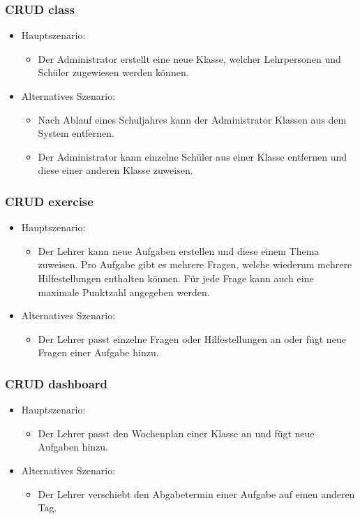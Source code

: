 \newpage

\subsubsection*{CRUD class}

\begin{itemize}
	\item Hauptszenario:
	\begin{itemize}
		\item Der Administrator erstellt eine neue Klasse, welcher Lehrpersonen und Schüler zugewiesen werden können.
	\end{itemize}
	\item Alternatives Szenario:
	\begin{itemize}
		\item Nach Ablauf eines Schuljahres kann der Administrator Klassen aus dem System entfernen.
		\item Der Administrator kann einzelne Schüler aus einer Klasse entfernen und diese einer anderen Klasse zuweisen.
	\end{itemize}
\end{itemize}


\subsubsection*{CRUD exercise}
\begin{itemize}
	\item Hauptszenario:
	\begin{itemize}
		\item Der Lehrer kann neue Aufgaben erstellen und diese einem Thema zuweisen. Pro Aufgabe gibt es mehrere Fragen, welche wiederum mehrere Hilfestellungen enthalten können. Für jede Frage kann auch eine maximale Punktzahl angegeben werden. 
	\end{itemize}
	\item Alternatives Szenario:
	\begin{itemize}
		\item Der Lehrer passt einzelne Fragen oder Hilfestellungen an oder fügt neue Fragen einer Aufgabe hinzu.
	\end{itemize}
\end{itemize}



\subsubsection*{CRUD dashboard}
\begin{itemize}
	\item Hauptszenario:
	\begin{itemize}
		\item Der Lehrer passt den Wochenplan einer Klasse an und fügt neue Aufgaben hinzu.
	\end{itemize}
	\item Alternatives Szenario:
	\begin{itemize}
		\item Der Lehrer verschiebt den Abgabetermin einer Aufgabe auf einen anderen Tag.
	\end{itemize}
\end{itemize}



